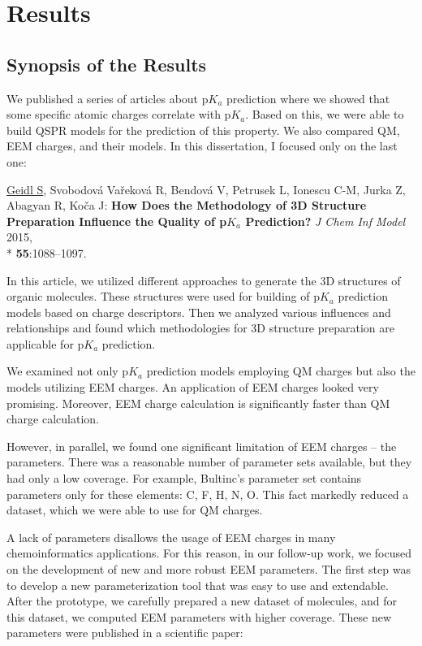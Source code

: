 \part{Results}
\label{part:results}

\chapter{Synopsis of the Results}

We published a series of articles about p$K_a$ prediction \cite{Svobodova2011, Svobodova2013} where we showed that
some specific atomic charges correlate with p$K_a$. Based on this, we were able
to build QSPR models for the prediction of this property. We also compared QM,
EEM charges, and their models.  In this dissertation, I focused only
on the last one:

\vspace{5mm}
\underline{Geidl S}, Svobodová Vařeková R, Bendová V, Petrusek L, Ionescu C-M,
Jurka Z, Abagyan R, Koča J: \textbf{How Does the Methodology of 3D Structure
Preparation Influence the Quality of p$K_a$ Prediction?} \textit{J Chem Inf Model}
2015, \\* \textbf{55}:1088–1097.
\vspace{5mm}

In this article, we utilized different approaches to generate the 3D structures
of organic molecules. These structures were used for building of p$K_a$
prediction models based on charge descriptors. Then we analyzed various
influences and relationships and found which methodologies for 3D structure
preparation are applicable for p$K_a$ prediction. 

We examined not only p$K_a$ prediction models employing QM charges but also the
models utilizing EEM charges. An application of EEM charges looked very
promising. Moreover, EEM charge calculation is significantly faster than
QM charge calculation. 

However, in parallel, we found one significant limitation of EEM charges -- the
parameters. There was a reasonable number of parameter sets available, but they
had only a low coverage.  For example, Bultinc's parameter
set \cite{Bultinck2002} contains parameters only for these elements: C, F, H, N,
O. This fact markedly reduced a dataset, which we were able to use for QM
charges. 

A lack of parameters disallows the usage of EEM charges in many chemoinformatics
applications. For this reason, in our follow-up work, we focused
on the development of new and more robust EEM parameters. The first step was to
develop a new parameterization tool that was easy to use and extendable.
After the prototype, we carefully prepared a new dataset of molecules, and
for this dataset, we computed EEM parameters with higher coverage. These new
parameters were published in a scientific paper:

